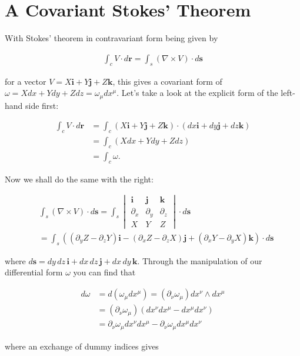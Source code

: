\documentclass[fleqn, twocolumn, 10pt]{article}
\begin{document}
\section{A Covariant Stokes' Theorem}

With Stokes' theorem in contravariant form being given by

\begin{ceqn}
\begin{align*}
\int_c V\cdot d\mathbf{r} =\int_s (\nabla \times V)\cdot d\mathbf{s}
\end{align*}
\end{ceqn}
for a vector $V = X\mathbf{i} + Y\mathbf{j} + Z\mathbf{k}$, this gives a covariant form of $\omega = Xdx + Ydy + Zdz = \omega_\mu dx^\mu$. Let's take a look at the explicit form of the left-hand side first:

\begin{ceqn}
\begin{align*}
\int_c V\cdot d\mathbf{r} &= \int_c (X\mathbf{i} + Y\mathbf{j} + Z\mathbf{k})\cdot (dx\mathbf{i} + dy\mathbf{j} + dz\mathbf{k})\\
&= \int_c (Xdx + Ydy + Zdz)\\
& = \int_c \omega.
\end{align*}
\end{ceqn}
Now we shall do the same with the right: 

\begin{ceqn}
\begin{align*}
&\int_s (\nabla \times V)\cdot d\mathbf{s} = \int_s
\begin{vmatrix}
\mathbf{i} & \mathbf{j} & \mathbf{k}\\
\partial_x & \partial_y & \partial_z\\
X & Y & Z
\end{vmatrix}
\cdot d\mathbf{s}\\
&=\int_s ((\partial_yZ - \partial_zY)\mathbf{i} - (\partial_xZ - \partial_zX)\mathbf{j} + (\partial_xY - \partial_yX)\mathbf{k}) \cdot d\mathbf{s}
\end{align*}
\end{ceqn}
where $d\mathbf{s} = dy\,dz\,\mathbf{i} + dx\,dz\,\mathbf{j} + dx\,dy\,\mathbf{k}$. Through the manipulation of our differential form $\omega$ you can find that

\begin{ceqn}
\begin{align*}
d\omega &= d(\omega_\mu dx^\mu) = (\partial_\nu \omega_\mu)dx^\nu \land dx^\mu\\ 
&= (\partial_\nu \omega_\mu)(dx^\nu dx^\mu - dx^\mu dx^\nu)\\ 
&= \partial_\nu \omega_\mu dx^\nu dx^\mu - \partial_\nu \omega_\mu dx^\mu dx^\nu
\end{align*}
\end{ceqn}
where an exchange of dummy indices gives
\end{document}
